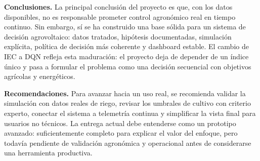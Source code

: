 \documentclass[11pt,a4paper]{article}
\begin{document}
\textbf{Conclusiones.} La principal conclusión del proyecto es que, con los datos disponibles, no es responsable prometer control agronómico real en tiempo continuo. Sin embargo, sí se ha construido una base sólida para un sistema de decisión agrovoltaico: datos tratados, hipótesis documentadas, simulación explícita, política de decisión más coherente y dashboard estable. El cambio de IEC a DQN refleja esta maduración: el proyecto deja de depender de un índice único y pasa a formular el problema como una decisión secuencial con objetivos agrícolas y energéticos.

\textbf{Recomendaciones.} Para avanzar hacia un uso real, se recomienda validar la simulación con datos reales de riego, revisar los umbrales de cultivo con criterio experto, conectar el sistema a telemetría continua y simplificar la vista final para usuarios no técnicos. La entrega actual debe entenderse como un prototipo avanzado: suficientemente completo para explicar el valor del enfoque, pero todavía pendiente de validación agronómica y operacional antes de considerarse una herramienta productiva.
\end{document}
